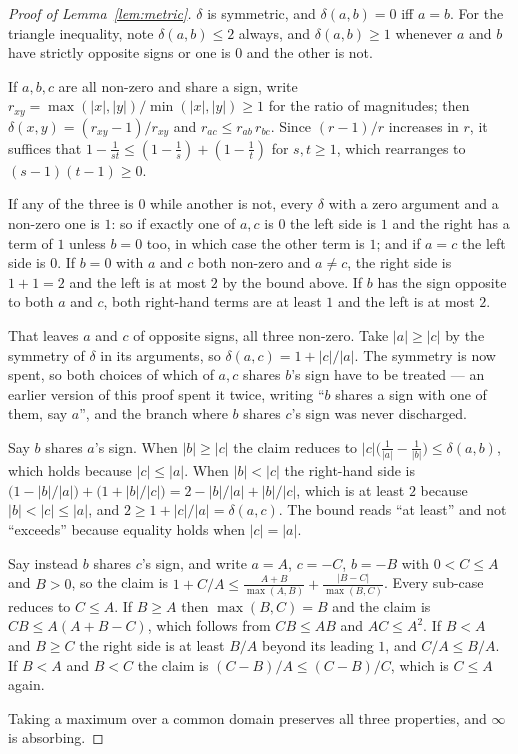 \begin{proof}[Proof of Lemma~\ref{lem:metric}]
$\delta$ is symmetric, and $\delta(a,b)=0$ iff $a=b$. For the triangle inequality, note
$\delta(a,b)\le 2$ always, and $\delta(a,b)\ge 1$ whenever $a$ and $b$ have strictly
opposite signs or one is $0$ and the other is not.

If $a,b,c$ are all non-zero and share a sign, write $r_{xy}=\max(|x|,|y|)/\min(|x|,|y|)\ge 1$ for the ratio
of magnitudes; then $\delta(x,y)=(r_{xy}-1)/r_{xy}$ and $r_{ac}\le r_{ab}\,r_{bc}$. Since
$(r-1)/r$ increases in $r$, it suffices that
$1-\tfrac{1}{st}\le(1-\tfrac1s)+(1-\tfrac1t)$ for $s,t\ge1$, which rearranges to
$(s-1)(t-1)\ge 0$.

If any of the three is $0$ while another is not, every $\delta$ with a zero argument and
a non-zero one is $1$: so if exactly one of $a,c$ is $0$ the left side is $1$ and the
right has a term of $1$ unless $b=0$ too, in which case the other term is $1$; and if
$a=c$ the left side is $0$. If $b=0$ with $a$ and $c$ both non-zero and $a\neq c$, the
right side is $1+1=2$ and the left is at most $2$ by the bound above. If $b$ has the
sign opposite to both $a$ and $c$, both right-hand terms are at least $1$ and the left is
at most $2$.

That leaves $a$ and $c$ of opposite signs, all three non-zero. Take $|a|\ge|c|$ by the
symmetry of $\delta$ in its arguments, so $\delta(a,c)=1+|c|/|a|$. The symmetry is now
spent, so both choices of which of $a,c$ shares $b$'s sign have to be treated --- an
earlier version of this proof spent it twice, writing ``$b$ shares a sign with one of
them, say $a$'', and the branch where $b$ shares $c$'s sign was never discharged.

Say $b$ shares $a$'s sign. When $|b|\ge|c|$ the claim reduces to
$|c|\big(\tfrac{1}{|a|}-\tfrac{1}{|b|}\big)\le\delta(a,b)$, which holds because
$|c|\le|a|$. When $|b|<|c|$ the right-hand side is
$\big(1-|b|/|a|\big)+\big(1+|b|/|c|\big)=2-|b|/|a|+|b|/|c|$, which is at least $2$
because $|b|<|c|\le|a|$, and $2\ge 1+|c|/|a|=\delta(a,c)$. The bound reads ``at least''
and not ``exceeds'' because equality holds when $|c|=|a|$.

Say instead $b$ shares $c$'s sign, and write $a=A$, $c=-C$, $b=-B$ with $0<C\le A$ and
$B>0$, so the claim is
$1+C/A\le\tfrac{A+B}{\max(A,B)}+\tfrac{|B-C|}{\max(B,C)}$. Every sub-case reduces to
$C\le A$. If $B\ge A$ then $\max(B,C)=B$ and the claim is $CB\le A(A+B-C)$, which follows
from $CB\le AB$ and $AC\le A^2$. If $B<A$ and $B\ge C$ the right side is at least $B/A$
beyond its leading $1$, and $C/A\le B/A$. If $B<A$ and $B<C$ the claim is
$(C-B)/A\le(C-B)/C$, which is $C\le A$ again.

Taking a maximum over a common domain
preserves all three properties, and $\infty$ is absorbing.
\end{proof}
